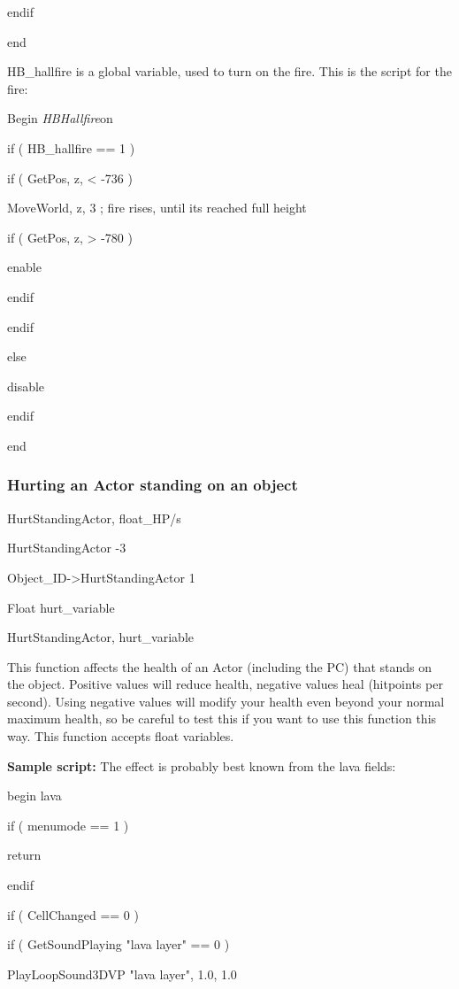 \documentclass[
]{article}
\begin{document}
endif

end

HB\_hallfire is a global variable, used to turn on the fire. This is the
script for the fire:

Begin \emph{HBHallfire}on

if ( HB\_hallfire == 1 )

if ( GetPos, z, \textless{} -736 )

MoveWorld, z, 3 ; fire rises, until its reached full height

if ( GetPos, z, \textgreater{} -780 )

enable

endif

endif

else

disable

endif

end

\hypertarget{hurting-an-actor-standing-on-an-object}{%
\subsubsection{Hurting an Actor standing on an
object}\label{hurting-an-actor-standing-on-an-object}}

HurtStandingActor, float\_HP/s

HurtStandingActor -3

Object\_ID-\textgreater HurtStandingActor 1

Float hurt\_variable

HurtStandingActor, hurt\_variable

This function affects the health of an Actor (including the PC) that
stands on the object. Positive values will reduce health, negative
values heal (hitpoints per second). Using negative values will modify
your health even beyond your normal maximum health, so be careful to
test this if you want to use this function this way. This function
accepts float variables.

\textbf{Sample script:} The effect is probably best known from the lava
fields:

begin lava

if ( menumode == 1 )

return

endif

if ( CellChanged == 0 )

if ( GetSoundPlaying "lava layer" == 0 )

PlayLoopSound3DVP "lava layer", 1.0, 1.0
\end{document}
